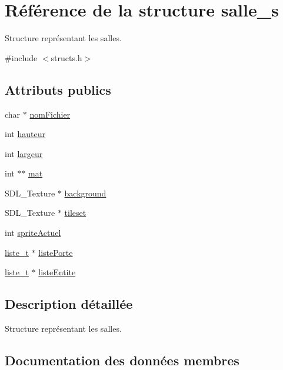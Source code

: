 \hypertarget{structsalle__s}{}\section{Référence de la structure salle\+\_\+s}
\label{structsalle__s}


Structure représentant les salles.  




{\ttfamily \#include $<$structs.\+h$>$}

\subsection*{Attributs publics}
\begin{DoxyCompactItemize}
\item 
char $\ast$ \hyperlink{structsalle__s_a12e47589795f5ed60109cf2b073ec671}{nom\+Fichier}
\item 
int \hyperlink{structsalle__s_a2be13fedfc5f31bc7f02c65af7d95c7a}{hauteur}
\item 
int \hyperlink{structsalle__s_ac1273e8d176620c3b9130d2f1e741315}{largeur}
\item 
int $\ast$$\ast$ \hyperlink{structsalle__s_ad9934630b58b551f8f185dead2006ba6}{mat}
\item 
S\+D\+L\+\_\+\+Texture $\ast$ \hyperlink{structsalle__s_a5ef73bdeb5f07b6c8b4978dcf265d0d2}{background}
\item 
S\+D\+L\+\_\+\+Texture $\ast$ \hyperlink{structsalle__s_a44a7c08d109019af0e4877e488cef708}{tileset}
\item 
int \hyperlink{structsalle__s_a0305fc652ff8d07decc455bfc34ea595}{sprite\+Actuel}
\item 
\hyperlink{structliste__s}{liste\+\_\+t} $\ast$ \hyperlink{structsalle__s_a8c3b513a26b2418863a37bfd91f86b11}{liste\+Porte}
\item 
\hyperlink{structliste__s}{liste\+\_\+t} $\ast$ \hyperlink{structsalle__s_a6c6c65ac4a856dbf75a104081e839b96}{liste\+Entite}
\end{DoxyCompactItemize}


\subsection{Description détaillée}
Structure représentant les salles. 

\subsection{Documentation des données membres}
\mbox{\label{structsalle__s_a5ef73bdeb5f07b6c8b4978dcf265d0d2}} 
